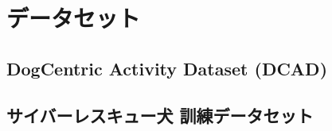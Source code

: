 \section{データセット}
\subsection{DogCentric Activity Dataset (DCAD)}
\subsection{サイバーレスキュー犬 訓練データセット}



